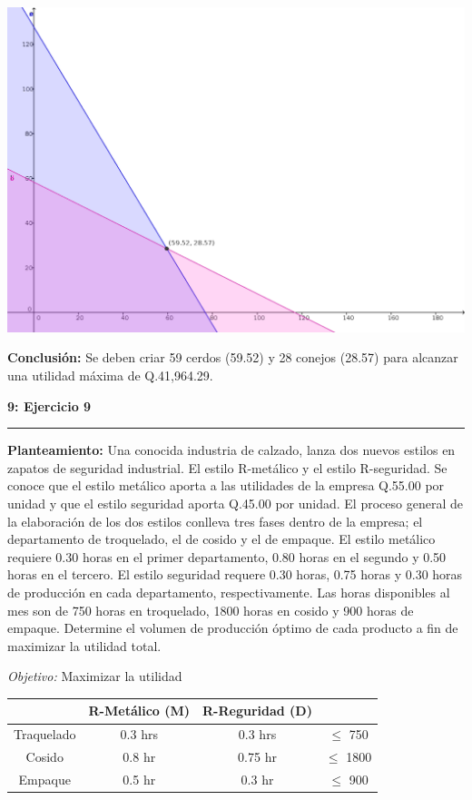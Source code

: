 \documentclass[11pt]{article}
\newcommand\problema[2]{\vspace{.01in}\textbf{#1: #2}\vspace{.5em}\hrule\vspace{.10in}}
\newcommand\planteamiento{\vspace{.10in}\textbf{Planteamiento: }}
\newcommand\conclusion{\vspace{.10in}\textbf{Conclusión: }}
\newcommand\obj{\vspace{.10in}\textit{Objetivo: }}
\begin{document}
\begin{center}
\includegraphics[scale=0.4]{parcial1src/problema7.png}
\end{center}
\conclusion Se deben criar 59 cerdos (59.52) y 28 conejos (28.57) para alcanzar una utilidad máxima de Q.41,964.29.

\pagebreak
\problema{9}{Ejercicio 9}
\planteamiento
Una conocida industria de calzado, lanza dos nuevos estilos en zapatos de seguridad industrial. El estilo R-metálico y el estilo R-seguridad. Se conoce que el estilo metálico aporta a las utilidades de la empresa Q.55.00 por unidad y que el estilo seguridad aporta Q.45.00 por unidad. El proceso general de la elaboración de los dos estilos conlleva tres fases dentro de la empresa; el departamento de troquelado, el de cosido y el de empaque. El estilo metálico requiere 0.30 horas en el primer departamento, 0.80 horas en el segundo y 0.50 horas en el tercero. El estilo seguridad requere 0.30 horas, 0.75 horas y 0.30 horas de producción en cada departamento, respectivamente. Las horas disponibles al mes son de 750 horas en troquelado, 1800 horas en cosido y 900 horas de empaque. Determine el volumen de producción óptimo de cada producto a fin de maximizar la utilidad total.


\obj Maximizar la utilidad

\begin{tabular}{|c|c|c|c|}
\hline 
 & R-Metálico (M) & R-Reguridad (D) &  \\ 
\hline 
Traquelado & 0.3 hrs & 0.3 hrs & $\leq$ 750 \\ 
\hline 
Cosido & 0.8 hr & 0.75 hr & $\leq$ 1800 \\ 
\hline 
Empaque & 0.5 hr & 0.3  hr & $\leq$ 900 \\ 
\hline 
\end{tabular}
\end{document}
